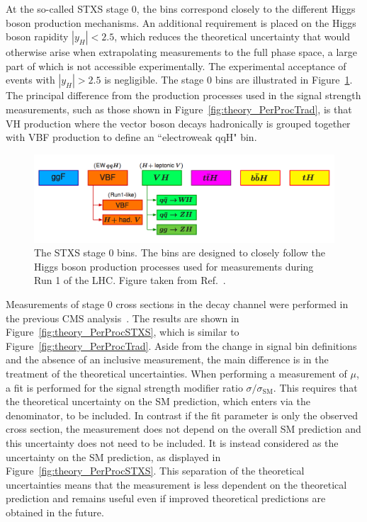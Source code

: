At the so-called STXS stage 0, 
the bins correspond closely to the different Higgs boson production mechanisms.
An additional requirement is placed on the Higgs boson rapidity $|y_H| < 2.5$, 
which reduces the theoretical uncertainty 
that would otherwise arise when extrapolating measurements to the full phase space,
a large part of which is not accessible experimentally.
The experimental acceptance of \Hgg events with $|y_H| > 2.5$ is negligible.
The stage 0 bins are illustrated in Figure~\ref{fig:theory_stage0}.
The principal difference from the production processes used in the signal strength measurements,
such as those shown in Figure~\ref{fig:theory_PerProcTrad},
is that VH production where the vector boson decays hadronically is grouped together with 
VBF production to define an ``electroweak qqH" bin.

\begin{figure}[hptb]
  \centering
  \includegraphics[width=\textwidth]{Figures/Theory/stage0.png}
  \caption[Stage 0 STXS bins.]
  {
    The STXS stage 0 bins. 
    The bins are designed to closely follow the Higgs boson production processes
    used for measurements during Run 1 of the LHC.
    Figure taken from Ref.~\cite{YR4}.
  }
  \label{fig:theory_stage0}
\end{figure}

Measurements of stage 0 cross sections in the \Hgg decay channel 
were performed in the previous CMS \Hgg analysis~\cite{HIG-16-040}.
The results are shown in Figure~\ref{fig:theory_PerProcSTXS}, 
which is similar to Figure~\ref{fig:theory_PerProcTrad}.
Aside from the change in signal bin definitions and the absence of an inclusive measurement, 
the main difference is in the treatment of the theoretical uncertainties.
When performing a measurement of $\mu$, 
a fit is performed for the signal strength modifier ratio $\sigma/\sigma_{\textrm{SM}}$. 
This requires that the theoretical uncertainty on the SM prediction, 
which enters via the denominator, to be included.
In contrast if the fit parameter is only the observed cross section, 
the measurement does not depend on the overall SM prediction 
and this uncertainty does not need to be included.
It is instead considered as the uncertainty on the SM prediction, 
as displayed in Figure~\ref{fig:theory_PerProcSTXS}.
This separation of the theoretical uncertainties means that the measurement is less dependent 
on the theoretical prediction and remains useful 
even if improved theoretical predictions are obtained in the future.

